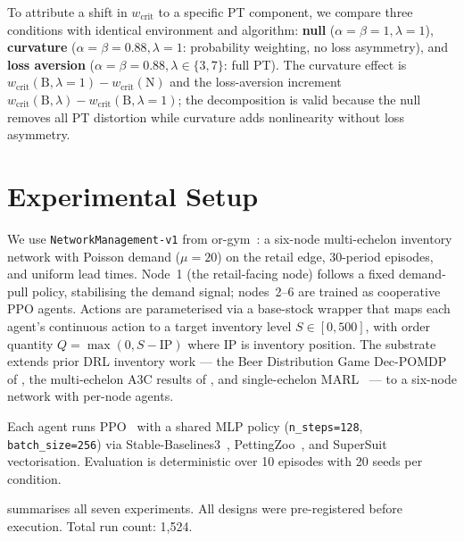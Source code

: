 \documentclass[letterpaper]{article}
\theoremstyle{plain}
\newcommand{\wcrit}{w_{\mathrm{crit}}}
\begin{document}
To attribute a shift in $\wcrit$ to a specific PT component, we compare three
conditions with identical environment and algorithm: \textbf{null}
($\alpha{=}\beta{=}1,\lambda{=}1$), \textbf{curvature}
($\alpha{=}\beta{=}0.88,\lambda{=}1$: probability weighting, no loss asymmetry),
and \textbf{loss aversion} ($\alpha{=}\beta{=}0.88,\lambda\in\{3,7\}$: full PT).
The curvature effect is $\wcrit(\text{B},\lambda{=}1)-\wcrit(\text{N})$ and the
loss-aversion increment $\wcrit(\text{B},\lambda)-\wcrit(\text{B},\lambda{=}1)$;
the decomposition is valid because the null removes all PT distortion while
curvature adds nonlinearity without loss asymmetry.

\section{Experimental Setup}
\label{sec:setup}

We use \texttt{NetworkManagement-v1} from or-gym~\citep{hubbs2020orgym}:
a six-node multi-echelon inventory network with Poisson demand
($\mu{=}20$) on the retail edge, 30-period episodes, and uniform lead
times.
Node~1 (the retail-facing node) follows a fixed demand-pull policy,
stabilising the demand signal; nodes~2--6 are trained as cooperative PPO
agents.
Actions are parameterised via a base-stock wrapper that maps each
agent's continuous action to a target inventory level $S \in [0, 500]$,
with order quantity $Q = \max(0, S - \mathrm{IP})$ where $\mathrm{IP}$
is inventory position.
The substrate extends prior DRL inventory work --- the Beer Distribution
Game Dec-POMDP of \citet{oroojlooyjadid2022}, the multi-echelon A3C
results of \citet{gijsbrechts2022}, and single-echelon
MARL~\citep{marlim2023} --- to a six-node network with per-node agents.

Each agent runs PPO~\citep{schulman2017ppo} with a shared MLP policy
(\texttt{n\_steps=128}, \texttt{batch\_size=256}) via
Stable-Baselines3~\citep{raffin2021sb3}, PettingZoo~\citep{terry2021pettingzoo},
and SuperSuit~\citep{terry2020supersuit} vectorisation.
Evaluation is deterministic over 10 episodes with 20 seeds per condition.

 summarises all seven experiments.
All designs were pre-registered before execution.
Total run count: 1,524.
\end{document}
